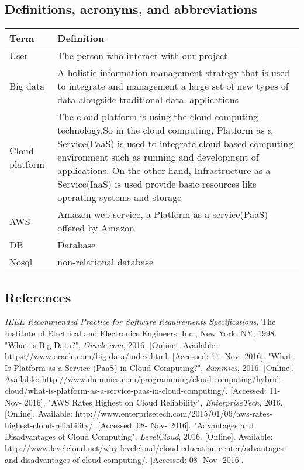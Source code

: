         \subsection{Definitions, acronyms, and abbreviations} 
        \begin{tabu} to 
        \hline
        \textbf{Term} & \textbf{Definition}\\
        \hline
        User & The person who interact with our project \\
        \hline
        Big data & A holistic information management strategy that is used to integrate and management a large set of new types of data alongside traditional data. applications\cite{big data}\\
        \hline
        Cloud platform & The cloud platform is using the cloud computing technology.So in the cloud computing, Platform as a Service(PaaS) is used to integrate cloud-based computing environment such as running and development of applications. On the other hand, Infrastructure as a Service(IaaS) is used provide basic resources like operating systems and storage\cite{cplatform}\\
        \hline
        AWS & Amazon web service, a Platform as a service(PaaS) offered by Amazon \\
        \hline
        DB & Database\\
        \hline
        Nosql & non-relational database\\
        \hline
        \end{tabu}
        
        \subsection{References}
        
        \begin{thebibliography}{9}
    
        \textit{IEEE Recommended Practice for Software Requirements Specifications}, The Institute of Electrical and Electronics Engineers, Inc., New York, NY, 1998.
        "What is Big Data?", \textit{Oracle.com}, 2016. [Online]. Available: https://www.oracle.com/big-data/index.html. [Accessed: 11- Nov- 2016].
        "What Is Platform as a Service (PaaS) in Cloud Computing?", \textit{dummies}, 2016. [Online]. Available: http://www.dummies.com/programming/cloud-computing/hybrid-cloud/what-is-platform-as-a-service-paas-in-cloud-computing/. [Accessed: 11- Nov- 2016].
        "AWS Rates Highest on Cloud Reliability", \textit{EnterpriseTech}, 2016. [Online]. Available: http://www.enterprisetech.com/2015/01/06/aws-rates-highest-cloud-reliability/. [Accessed: 08- Nov- 2016].
        "Advantages and Disadvantages of Cloud Computing", \textit{LevelCloud}, 2016. [Online]. Available: http://www.levelcloud.net/why-levelcloud/cloud-education-center/advantages-and-disadvantages-of-cloud-computing/. [Accessed: 08- Nov- 2016].
        
        \end{thebibliography}

